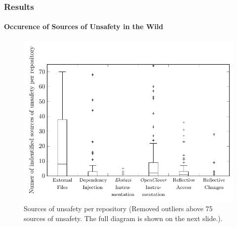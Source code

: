 \documentclass[notes,aspectratio=169]{beamer}
\begin{document}
\begin{subframe}[fragile]
   \frametitle{Results}
   \framesubtitle{Occurence of Sources of Unsafety in the Wild}
   \begin{figure}
      \begin{minipage}[c]{0.67\textwidth}
         \includegraphics[scale=0.7]{./figures/pdf/box_plot.pdf}
      \end{minipage}\hfill
      \begin{minipage}[c]{0.3\textwidth}
         \caption{
            Sources of unsafety per repository (Removed outliers above 75 sources of unsafety. The full diagram is shown on the next slide.).
         }
      \end{minipage}
   \end{figure}
\end{subframe}
\end{document}

